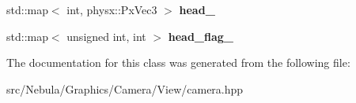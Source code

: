 \begin{DoxyCompactItemize}
\item 
\hypertarget{classneb_1_1camera_1_1camera_ad7207f50c2cfe3402fa57334f7557d03}{std\-::map$<$ int, physx\-::\-Px\-Vec3 $>$ {\bfseries head\-\_\-}}\label{classneb_1_1camera_1_1camera_ad7207f50c2cfe3402fa57334f7557d03}

\item 
\hypertarget{classneb_1_1camera_1_1camera_a011e06042be1b866b098f91ff2413921}{std\-::map$<$ unsigned int, int $>$ {\bfseries head\-\_\-flag\-\_\-}}\label{classneb_1_1camera_1_1camera_a011e06042be1b866b098f91ff2413921}

\end{DoxyCompactItemize}


\-The documentation for this class was generated from the following file\-:\begin{DoxyCompactItemize}
\item 
src/\-Nebula/\-Graphics/\-Camera/\-View/camera.\-hpp\end{DoxyCompactItemize}
